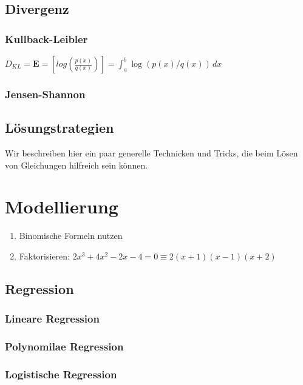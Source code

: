 \documentclass[letterpaper, titlepage]{article}
\begin{document}
\subsection{Divergenz}\label{Divergenz}
\subsubsection{Kullback-Leibler}\label{Kullback-Leibler}
$D_{KL}=\mathbf{E}=[log(\frac{p(x)}{q(x)} )]= \int_{a}^{b}  \log (p(x)/q(x))\,dx  $
\subsubsection{Jensen-Shannon}\label{Jensen-Shannon}
\subsection{Lösungstrategien}
Wir beschreiben hier ein paar generelle Technicken und Tricks, die beim Lösen von Gleichungen hilfreich sein können. 
\section{Modellierung}
\begin{enumerate}
    \item Binomische Formeln nutzen 
    \item Faktorisieren: $2x^3+4x^2-2x-4=0 \equiv 2(x+1)(x-1)(x+2)$
\end{enumerate}
\subsection{Regression}
\subsubsection{Lineare Regression}
\subsubsection{Polynomilae Regression}
\subsubsection{Logistische Regression}
\end{document}
